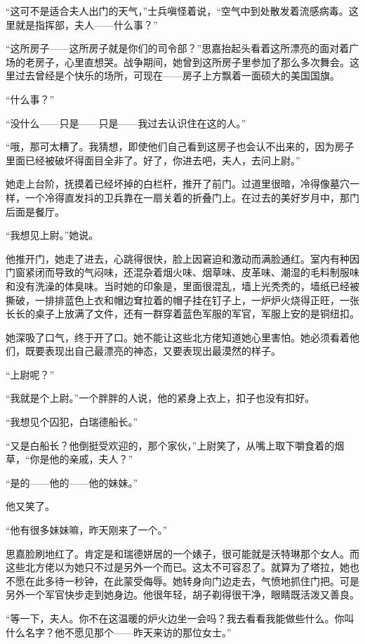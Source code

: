 \par “这可不是适合夫人出门的天气，”士兵嗔怪着说，“空气中到处散发着流感病毒。这里就是指挥部，夫人——什么事？”
\par “这所房子——这所房子就是你们的司令部？”思嘉抬起头看着这所漂亮的面对着广场的老房子，心里直想哭。战争期间，她曾到这所房子里参加了那么多次舞会。这里过去曾经是个快乐的场所，可现在——房子上方飘着一面硕大的美国国旗。
\par “什么事？”
\par “没什么——只是——只是——我过去认识住在这的人。”
\par “哦，那可太糟了。我猜想，即使他们自己看到这房子也会认不出来的，因为房子里面已经被破坏得面目全非了。好了，你进去吧，夫人，去问上尉。”
\par 她走上台阶，抚摸着已经坏掉的白栏杆，推开了前门。过道里很暗，冷得像墓穴一样，一个冷得直发抖的卫兵靠在一扇关着的折叠门上。在过去的美好岁月中，那门后面是餐厅。
\par “我想见上尉。”她说。
\par 他推开门，她走了进去，心跳得很快，脸上因窘迫和激动而满脸通红。室内有种因门窗紧闭而导致的气闷味，还混杂着烟火味、烟草味、皮革味、潮湿的毛料制服味和没有洗澡的体臭味。当时她的印象是，里面很混乱，墙上光秃秃的，墙纸已经被撕破，一排排蓝色上衣和帽边耷拉着的帽子挂在钉子上，一炉炉火烧得正旺，一张长长的桌子上放满了文件，还有一群穿着蓝色军服的军官，军服上安的是铜纽扣。
\par 她深吸了口气，终于开了口。她不能让这些北方佬知道她心里害怕。她必须看着他们，既要表现出自己最漂亮的神态，又要表现出最漠然的样子。
\par “上尉呢？”
\par “我就是个上尉。”一个胖胖的人说，他的紧身上衣上，扣子也没有扣好。
\par “我想见个囚犯，白瑞德船长。”
\par “又是白船长？他倒挺受欢迎的，那个家伙，”上尉笑了，从嘴上取下嚼食着的烟草，“你是他的亲戚，夫人？”
\par “是的——他的——他的妹妹。”
\par 他又笑了。
\par “他有很多妹妹嘛，昨天刚来了一个。”
\par 思嘉脸刷地红了。肯定是和瑞德姘居的一个婊子，很可能就是沃特琳那个女人。而这些北方佬以为她只不过是另外一个而已。这太不可容忍了。就算为了塔拉，她也不愿在此多待一秒钟，在此蒙受侮辱。她转身向门边走去，气愤地抓住门把。可是另外一个军官快步走到她身边。他很年轻，胡子剃得很干净，眼睛既活泼又善良。
\par “等一下，夫人。你不在这温暖的炉火边坐一会吗？我去看看我能做些什么。你叫什么名字？他不愿见那个——昨天来访的那位女士。”

